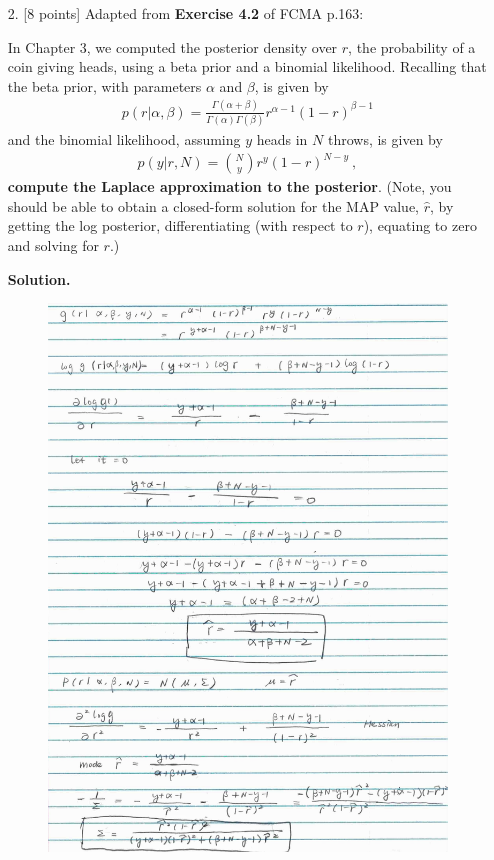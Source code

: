 \documentclass[10pt]{article}
\begin{document}
\begin{itemize}
\item[2.]  [8 points]
Adapted from {\bf Exercise 4.2} of FCMA p.163:

In Chapter 3, we computed the posterior density over $r$, the probability of a coin giving heads, using a beta prior and a binomial likelihood.  Recalling that the beta prior, with parameters $\alpha$ and $\beta$, is given by
\begin{eqnarray*}
p(r | \alpha, \beta) = \frac{\Gamma(\alpha + \beta)}{\Gamma(\alpha) \Gamma(\beta)} r^{\alpha - 1} (1 - r)^{\beta - 1}
\end{eqnarray*}
and the binomial likelihood, assuming $y$ heads in $N$ throws, is given by
\begin{eqnarray*}
p(y | r, N) = {N \choose y} r^{y} (1 - r)^{N-y} ~,
\end{eqnarray*}
{\bf compute the Laplace approximation to the posterior}.  (Note, you should be able to obtain a closed-form solution for the MAP value, $\hat{r}$, by getting the log posterior, differentiating (with respect to $r$), equating to zero and solving for $r$.)

{\bf Solution.}
\FloatBarrier
\begin{figure}[h!]
\centering
\includegraphics[width=1\linewidth]{figures/HW4_2.jpeg}
\end{figure}
\FloatBarrier


\end{itemize}
\end{document}
